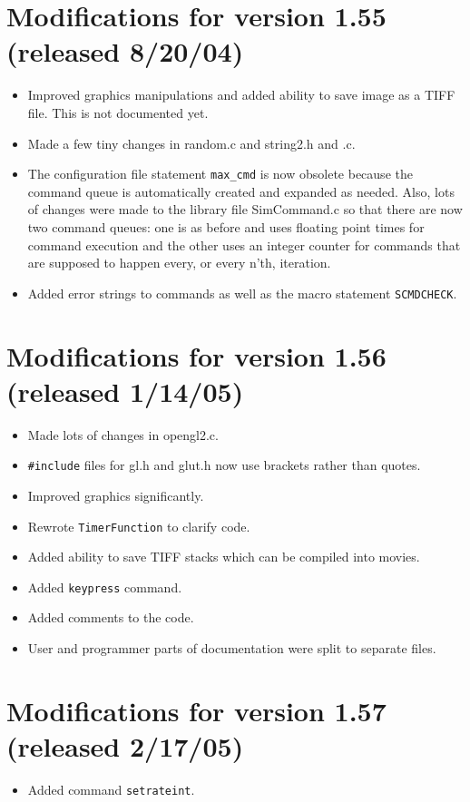 \documentclass {scrbook}
\newcommand {\ttt} {\texttt}
\begin{document}
\section{Modifications for version 1.55 (released 8/20/04)}
\begin{itemize}
\item Improved graphics manipulations and added ability to save image as a TIFF file. This is not documented yet.
\item Made a few tiny changes in random.c and string2.h and .c.
\item The configuration file statement \ttt{max\_cmd} is now obsolete because the command queue is automatically created and expanded as needed. Also, lots of changes were made to the library file SimCommand.c so that there are now two command queues: one is as before and uses floating point times for command execution and the other uses an integer counter for commands that are supposed to happen every, or every n'th, iteration.
\item Added error strings to commands as well as the macro statement \ttt{SCMDCHECK}.
\end{itemize}

\section{Modifications for version 1.56 (released 1/14/05)}
\begin{itemize}
\item Made lots of changes in opengl2.c.
\item \ttt{\#include} files for gl.h and glut.h now use brackets rather than quotes.
\item Improved graphics significantly.
\item Rewrote \ttt{TimerFunction} to clarify code.
\item Added ability to save TIFF stacks which can be compiled into movies.
\item Added \ttt{keypress} command.
\item Added comments to the code.
\item User and programmer parts of documentation were split to separate files.
\end{itemize}

\section{Modifications for version 1.57 (released 2/17/05)}
\begin{itemize}
\item Added command \ttt{setrateint}.
\end{itemize}
\end{document}
